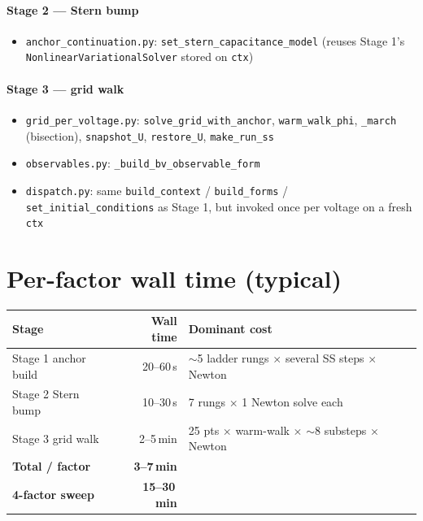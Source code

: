 \documentclass[11pt]{article}
\begin{document}
\paragraph{\textcolor{stageTwo}{Stage 2 --- Stern bump}}
\begin{itemize}\setlength{\itemsep}{1pt}\small
\item \texttt{anchor\_continuation.py}:
  \texttt{set\_stern\_capacitance\_model} (reuses Stage 1's
  \texttt{NonlinearVariationalSolver} stored on \texttt{ctx})
\end{itemize}

\paragraph{\textcolor{stageThree}{Stage 3 --- grid walk}}
\begin{itemize}\setlength{\itemsep}{1pt}\small
\item \texttt{grid\_per\_voltage.py}:
  \texttt{solve\_grid\_with\_anchor},
  \texttt{warm\_walk\_phi},
  \texttt{\_march} (bisection),
  \texttt{snapshot\_U}, \texttt{restore\_U},
  \texttt{make\_run\_ss}
\item \texttt{observables.py}:
  \texttt{\_build\_bv\_observable\_form}
\item \texttt{dispatch.py}: same
  \texttt{build\_context} / \texttt{build\_forms} /
  \texttt{set\_initial\_conditions} as Stage 1, but invoked once
  per voltage on a fresh \texttt{ctx}
\end{itemize}

\section{Per-factor wall time (typical)}

\begin{center}
\renewcommand{\arraystretch}{1.15}
\begin{tabular}{@{}lr l@{}}
\toprule
\textbf{Stage} & \textbf{Wall time} & \textbf{Dominant cost} \\
\midrule
Stage 1 anchor build      & 20--60\,s   &
   $\sim$5 ladder rungs $\times$ several SS steps $\times$ Newton \\
Stage 2 Stern bump        & 10--30\,s   &
   7 rungs $\times$ 1 Newton solve each \\
Stage 3 grid walk         & 2--5\,min   &
   25 pts $\times$ warm-walk $\times$ $\sim$8 substeps $\times$ Newton \\
\midrule
\textbf{Total / factor}   & \textbf{3--7\,min}    & \\
\textbf{4-factor sweep}   & \textbf{15--30\,min}  & \\
\bottomrule
\end{tabular}
\end{center}
\end{document}
